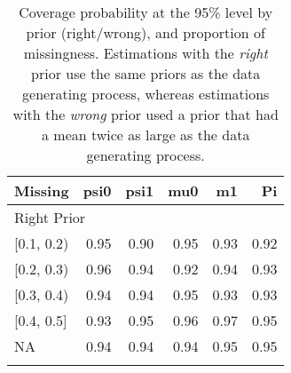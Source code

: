 \begin{table}[ht]
\centering
\begin{tabular}{lrrrrr}
  \toprule
Missing & psi0 & psi1 & mu0 & m1 & Pi \\ 
  \midrule
\multicolumn{6}{l}{Right Prior}\\
{[0.1, 0.2)} & 0.95 & 0.90 & 0.95 & 0.93 & 0.92 \\ 
  {[0.2, 0.3)} & 0.96 & 0.94 & 0.92 & 0.94 & 0.93 \\ 
  {[0.3, 0.4)} & 0.94 & 0.94 & 0.95 & 0.93 & 0.93 \\ 
  {[0.4, 0.5]} & 0.93 & 0.95 & 0.96 & 0.97 & 0.95 \\ 
  {NA} & 0.94 & 0.94 & 0.94 & 0.95 & 0.95 \\ 
   \bottomrule
\multicolumn{6}{l}{}\\
\end{tabular}
\caption{Coverage probability at the 95\% level by prior (right/wrong), and proportion of missingness. Estimations with the \emph{right} prior use the same priors as the data generating process, whereas estimations with the \emph{wrong} prior used a prior that had a mean twice as large as the data generating process.} 
\label{tab:coverage95-method-missigness}
\end{table}

